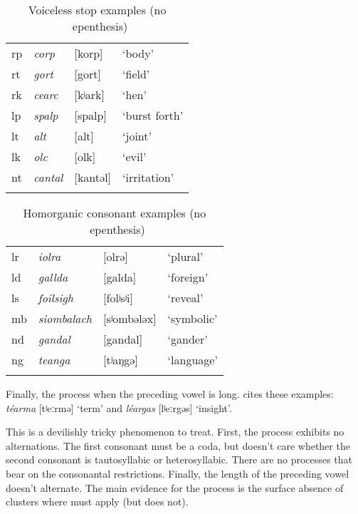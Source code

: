 \documentclass[output=paper,colorlinks,citecolor=brown]{langscibook}
\begin{document}
\begin{table}
\caption{Voiceless stop examples (no \ir\ epenthesis)}
\label{ir.epenth.vcl.stops.tab}
\begin{tabularx}{.6\textwidth}{lllQ}
\lsptoprule
rp & \itshape corp     & [korp]   & `body' \\
rt & \itshape gort     & [gort]   & `field' \\
rk & \itshape cearc    & [kʲark]  & `hen' \\
lp & \itshape spalp    & [spalp]  & `burst forth' \\
lt & \itshape alt      & [alt]   & `joint' \\
lk & \itshape olc      & [olk]    & `evil' \\
nt & \itshape cantal   & [kantəl] & `irritation' \\
\lspbottomrule
\end{tabularx}
\end{table}

\begin{table}
\caption{Homorganic consonant examples (no \ir\ epenthesis)}
\label{ir.epenth.homorganic.tab}
\begin{tabularx}{.6\textwidth}{lllQ}
\lsptoprule
lr & \itshape iolra      & [olrə]       & `plural' \\
ld & \itshape gallda     & [galda]      & `foreign' \\
ls & \itshape foilsigh   & [folʲsʲi]    & `reveal' \\
mb & \itshape siombalach & [sʲombələx]  & `symbolic' \\
nd & \itshape gandal     & [gandal]     & `gander' \\
ng & \itshape teanga     & [tʲaŋgə]     & `language' \\
\lspbottomrule
\end{tabularx}
\end{table}

Finally, the process  when the preceding vowel is long. \citet{ni.chiosain.diss} cites these examples: \emph{t\'earma} [tʲeːrmə] `term' and \emph{l\'eargas} [lʲeːrgəs] `insight'.

This is a devilishly tricky phenomenon to treat. First, the process exhibits no alternations. The first consonant must be a coda, but  doesn't care whether the second consonant is tautosyllabic or heterosyllabic. There are no processes that bear on the consonantal restrictions. Finally, the length of the preceding vowel doesn't alternate. The main evidence for the process is the surface absence of clusters where  must apply (but does not).
\end{document}
